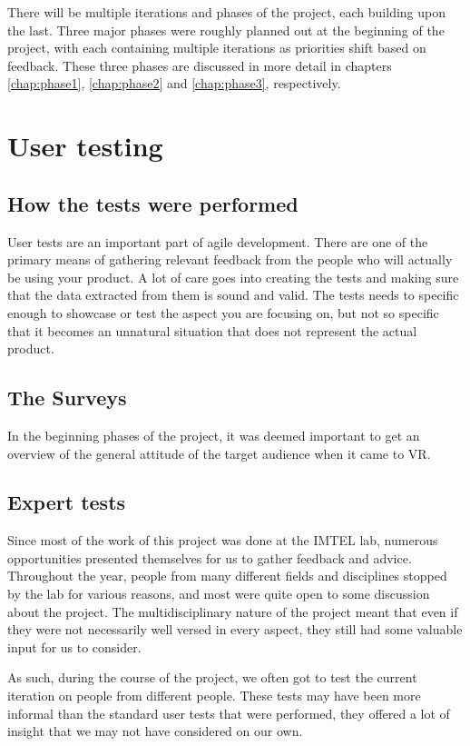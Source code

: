 There will be multiple iterations and phases of the project, each building upon the last. Three major phases were roughly planned out at the beginning of the project, with each containing multiple iterations as priorities shift based on feedback. These three phases are discussed in more detail in chapters \ref{chap:phase1}, \ref{chap:phase2} and \ref{chap:phase3}, respectively.


\section{User testing}
\subsection{How the tests were performed}
User tests are an important part of agile development. There are one of the primary means of gathering relevant feedback from the people who will actually be using your product. A lot of care goes into creating the tests and making sure that the data extracted from them is sound and valid. The tests needs to specific enough to showcase or test the aspect you are focusing on, but not so specific that it becomes an unnatural situation that does not represent the actual product.


\subsection{The Surveys}
In the beginning phases of the project, it was deemed important to get an overview of the general attitude of the target audience when it came to VR. 


\subsection{Expert tests}
Since most of the work of this project was done at the IMTEL lab, numerous opportunities presented themselves for us to gather feedback and advice. Throughout the year, people from many different fields and disciplines stopped by the lab for various reasons, and most were quite open to some discussion about the project. The multidisciplinary nature of the project meant that even if they were not necessarily well versed in every aspect, they still had some valuable input for us to consider.

As such, during the course of the project, we often got to test the current iteration on people from different people. These tests may have been more informal than the standard user tests that were performed, they offered a lot of insight that we may not have considered on our own.




\cleardoublepage